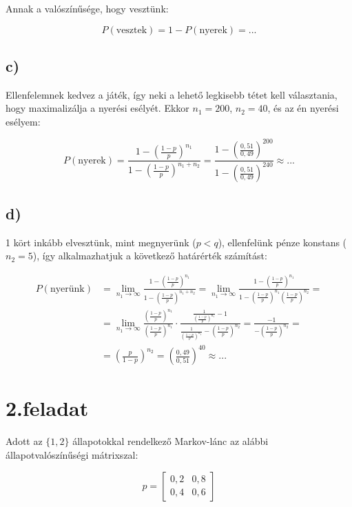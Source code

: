 \documentclass[a4paper,12pt]{article}
\begin{document}
Annak a valószínűsége, hogy vesztünk:

\[
P(\textrm{vesztek}) = 1 - P(\textrm{nyerek}) = ...
\]

\subsection*{c)}
Ellenfelemnek kedvez a játék, így neki a lehető legkisebb tétet kell
választania, hogy maximalizálja a nyerési esélyét. 
Ekkor $n_1 = 200$, $n_2 = 40$, és az én nyerési esélyem:

\[
P(\textrm{nyerek}) = 
\frac{1 - \left( \frac{1-p}{p} \right)^{n_1}}
{1 - \left( \frac{1-p}{p} \right)^{n_1 + n_2}} = 
\frac{1 - \left( \frac{0,51}{0,49} \right)^{200}}
{1 - \left( \frac{0,51}{0,49} \right)^{240}} \approx ...
\]

\subsection*{d)}
1 kört inkább elvesztünk, mint megnyerünk ($p < q$), ellenfelünk pénze
konstans ($n_2 = 5$), így alkalmazhatjuk a következő határérték számítást:

\[
\begin{split}
P(\text{nyerünk}) &= 
\lim_{n_1 \to \infty} \frac{1-\left(\frac{1-p}{p}\right)^{n_1}}
{1-\left(\frac{1-p}{p}\right)^{n_1+n_2}} =
\lim_{n_1 \to \infty} \frac{1-\left(\frac{1-p}{p}\right)^{n_1}}
{1-\left(\frac{1-p}{p}\right)^{n_1}\left(\frac{1-p}{p}\right)^{n_2}} =\\
&= \lim_{n_1 \to \infty} \frac{\left(\frac{1-p}{p}\right)^{n_1}}
{\left(\frac{1-p}{p}\right)^{n_1}} \cdot 
\frac{\frac{1}{\left(\frac{1-p}{p}\right)^{n_1}}-1}
{\frac{1}{\left(\frac{1-p}{p}\right)^{n_1}} -
\left(\frac{1-p}{p}\right)^{n_2}} 
= \frac{-1}{-\left(\frac{1-p}{p}\right)^{n_2}} =\\
&= \left(\frac{p}{1-p}\right)^{n_2} = 
\left(\frac{0,49}{0,51}\right)^{40} \approx ...
\end{split}
\]

\section*{2.feladat}
Adott az $\{1, 2\}$ állapotokkal rendelkező Markov-lánc 
az alábbi állapotvalószínűségi mátrixszal:

\[
p = 
\begin{bmatrix} 
0,2    &    0,8 \\
0,4    &    0,6
\end{bmatrix}
\]
\end{document}
